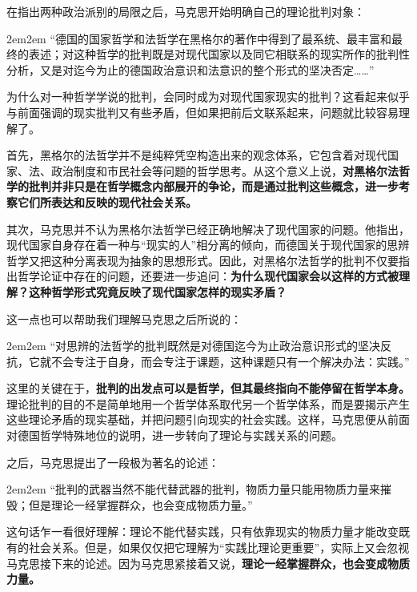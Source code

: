 \documentclass[a4paper,twoside,12pt,AutoFakeBold]{ctexart}
\begin{document}
在指出两种政治派别的局限之后，马克思开始明确自己的理论批判对象：

\begin{adjustwidth}{2em}{2em}
\qquad\fangsong
“德国的国家哲学和法哲学在黑格尔的著作中得到了最系统、最丰富和最终的表述；对这种哲学的批判既是对现代国家以及同它相联系的现实所作的批判性分析，又是对迄今为止的德国政治意识和法意识的整个形式的坚决否定……”
\end{adjustwidth}

为什么对一种哲学学说的批判，会同时成为对现代国家现实的批判？这看起来似乎与前面强调的现实批判又有些矛盾，但如果把前后文联系起来，问题就比较容易理解了。

首先，黑格尔的法哲学并不是纯粹凭空构造出来的观念体系，它包含着对现代国家、法、政治制度和市民社会等问题的哲学思考。从这个意义上说，\textbf{对黑格尔法哲学的批判并非只是在哲学概念内部展开的争论，而是通过批判这些概念，进一步考察它们所表达和反映的现代社会关系。}

其次，马克思并不认为黑格尔法哲学已经正确地解决了现代国家的问题。他指出，现代国家自身存在着一种与“现实的人”相分离的倾向，而德国关于现代国家的思辨哲学又把这种分离表现为抽象的思想形式。因此，对黑格尔法哲学的批判不仅要指出哲学论证中存在的问题，还要进一步追问：\textbf{为什么现代国家会以这样的方式被理解？这种哲学形式究竟反映了现代国家怎样的现实矛盾？}

这一点也可以帮助我们理解马克思之后所说的：

\begin{adjustwidth}{2em}{2em}
\qquad\fangsong
“对思辨的法哲学的批判既然是对德国迄今为止政治意识形式的坚决反抗，它就不会专注于自身，而会专注于课题，这种课题只有一个解决办法：实践。”
\end{adjustwidth}

这里的关键在于，\textbf{批判的出发点可以是哲学，但其最终指向不能停留在哲学本身。}理论批判的目的不是简单地用一个哲学体系取代另一个哲学体系，而是要揭示产生这些理论矛盾的现实基础，并把问题引向现实的社会实践。这样，马克思便从前面对德国哲学特殊地位的说明，进一步转向了理论与实践关系的问题。

之后，马克思提出了一段极为著名的论述：

\begin{adjustwidth}{2em}{2em}
\qquad\fangsong
“批判的武器当然不能代替武器的批判，物质力量只能用物质力量来摧毁；但是理论一经掌握群众，也会变成物质力量。”
\end{adjustwidth}

这句话乍一看很好理解：理论不能代替实践，只有依靠现实的物质力量才能改变既有的社会关系。但是，如果仅仅把它理解为“实践比理论更重要”，实际上又会忽视马克思接下来的论述。因为马克思紧接着又说，\textbf{理论一经掌握群众，也会变成物质力量。}
\end{document}
